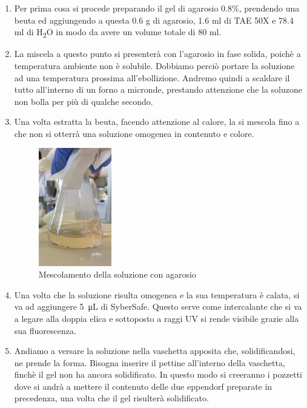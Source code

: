 \begin{enumerate}

	\item Per prima cosa si procede preparando il gel di agarosio 0.8\%, prendendo una beuta
	ed aggiungendo a questa 0.6 g di agarosio, 1.6 ml di TAE 50X e 78.4 ml di H\textsubscript{2}O
	in modo da avere un volume totale di 80 ml.

	\item La miscela a questo punto si presenterà con l'agarosio in fase solida,
	poichè a temperatura ambiente non è solubile.
	Dobbiamo perciò portare la soluzione ad una temperatura prossima all'ebollizione.
	Andremo quindi a scaldare il tutto all'interno di un forno a micronde, prestando attenzione
	che la soluzone non bolla per più di qualche secondo.

	\item Una volta estratta la beuta, facendo attenzione al calore,
	la si mescola fino a che non si otterrà una soluzione omogenea in contenuto e colore.

	\begin{figure}[H]
		\centering
		\includegraphics[width=0.3\textwidth]{./immagini/agarosio.jpg}
		\caption{Mescolamento della soluzione con agarosio}
		\label{agarosio}

	\end{figure}

	\item Una volta che la soluzione risulta omogenea e la sua temperatura \`e calata,
	si va ad aggiungere \SI{5}{\micro\liter} di SyberSafe.
	Questo serve come intercalante che si va a legare alla doppia elica
	e sottoposto a raggi UV si rende visibile grazie alla sua fluorescenza.

	\item Andiamo a versare la soluzione nella vaschetta apposita che,
	solidificandosi, ne prende la forma.
	Bisogna inserire il pettine all'interno della vaschetta,
	finch\`e il gel non ha ancora solidificato.
	In questo modo si creeranno i pozzetti dove si andrà a mettere il contenuto delle
	due eppendorf preparate in precedenza, una volta che il gel risulter\`a solidificato.


\end{enumerate}
